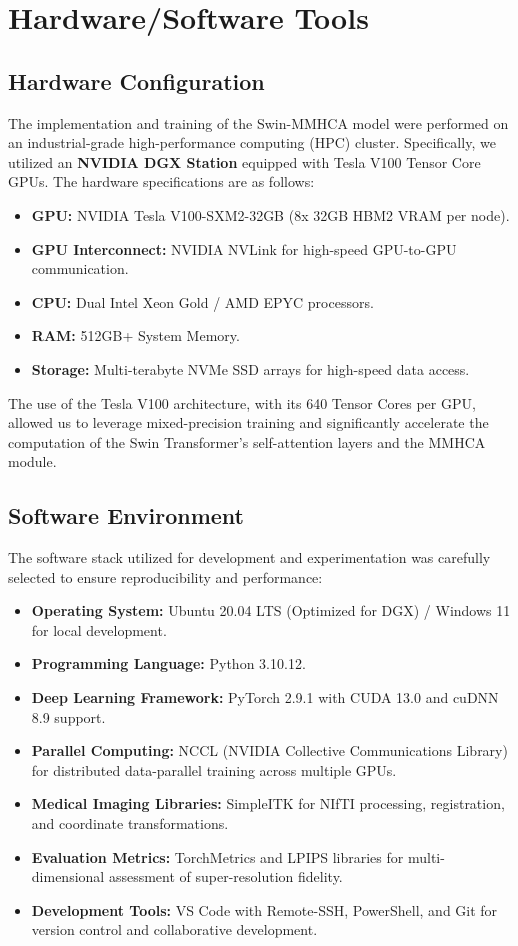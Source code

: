 \chapter{Hardware/Software Tools}

\section{Hardware Configuration}
The implementation and training of the Swin-MMHCA model were performed on an industrial-grade high-performance computing (HPC) cluster. Specifically, we utilized an \textbf{NVIDIA DGX Station} equipped with Tesla V100 Tensor Core GPUs. The hardware specifications are as follows:
\begin{itemize}
    \item \textbf{GPU:} NVIDIA Tesla V100-SXM2-32GB (8x 32GB HBM2 VRAM per node).
    \item \textbf{GPU Interconnect:} NVIDIA NVLink for high-speed GPU-to-GPU communication.
    \item \textbf{CPU:} Dual Intel Xeon Gold / AMD EPYC processors.
    \item \textbf{RAM:} 512GB+ System Memory.
    \item \textbf{Storage:} Multi-terabyte NVMe SSD arrays for high-speed data access.
\end{itemize}
The use of the Tesla V100 architecture, with its 640 Tensor Cores per GPU, allowed us to leverage mixed-precision training and significantly accelerate the computation of the Swin Transformer's self-attention layers and the MMHCA module.

\section{Software Environment}
The software stack utilized for development and experimentation was carefully selected to ensure reproducibility and performance:
\begin{itemize}
    \item \textbf{Operating System:} Ubuntu 20.04 LTS (Optimized for DGX) / Windows 11 for local development.
    \item \textbf{Programming Language:} Python 3.10.12.
    \item \textbf{Deep Learning Framework:} PyTorch 2.9.1 with CUDA 13.0 and cuDNN 8.9 support.
    \item \textbf{Parallel Computing:} NCCL (NVIDIA Collective Communications Library) for distributed data-parallel training across multiple GPUs.
    \item \textbf{Medical Imaging Libraries:} SimpleITK for NIfTI processing, registration, and coordinate transformations.
    \item \textbf{Evaluation Metrics:} TorchMetrics and LPIPS libraries for multi-dimensional assessment of super-resolution fidelity.
    \item \textbf{Development Tools:} VS Code with Remote-SSH, PowerShell, and Git for version control and collaborative development.
\end{itemize}

